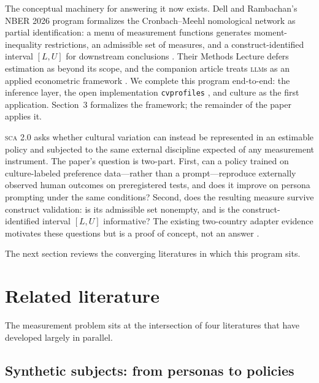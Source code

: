 \documentclass[10pt,letterpaper]{article}
\newcommand{\SCA}{\textsc{sca}}
\newcommand{\LLM}{\textsc{llm}}
\newcommand{\cvp}{\texttt{cvprofiles}}
\begin{document}
The conceptual machinery for answering it now exists. Dell and Rambachan's NBER 2026 program formalizes the Cronbach--Meehl nomological network \cite{cronbach1955} as partial identification: a menu of measurement functions generates moment-inequality restrictions, an admissible set of measures, and a construct-identified interval $[L,U]$ for downstream conclusions \cite{dellrambachan2026}. Their Methods Lecture defers estimation as beyond its scope, and the companion article treats \LLM{}s as an applied econometric framework \cite{ludwig2026}. We complete this program end-to-end: the inference layer, the open implementation \cvp{} \cite{cvprofiles}, and culture as the first application. Section~3 formalizes the framework; the remainder of the paper applies it.

\SCA{} 2.0 asks whether cultural variation can instead be represented in an estimable policy and subjected to the same external discipline expected of any measurement instrument. The paper's question is two-part. First, can a policy trained on culture-labeled preference data---rather than a prompt---reproduce externally observed human outcomes on preregistered tests, and does it improve on persona prompting under the same conditions? Second, does the resulting measure survive construct validation: is its admissible set nonempty, and is the construct-identified interval $[L,U]$ informative? The existing two-country adapter evidence motivates these questions but is a proof of concept, not an answer \cite{capra2025}.

The next section reviews the converging literatures in which this program sits.
\clearpage

\section{Related literature}

The measurement problem sits at the intersection of four literatures that have developed largely in parallel.

\subsection{Synthetic subjects: from personas to policies}
\end{document}
